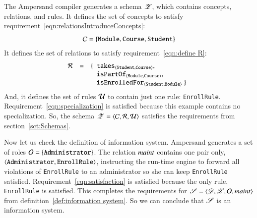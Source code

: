 \documentclass{elsarticle}
\begin{document}
   The Ampersand compiler generates a schema $\mathscr{Z}$, which contains concepts, relations, and rules.
   It defines the set of concepts to satisfy requirement~\ref{eqn:relationsIntroduceConcepts}:
   \[\mathcal{C}=\{ {\tt Module}, {\tt Course}, {\tt Student}\}\]
   It defines the set of relations to satisfy requirement~\ref{eqn:define R}:
   \[\begin{array}{rcl}
      \rels&=&\{\begin{array}[t]{l}
                  \declare{\tt takes}{\tt Student}{\tt Course},\\
                  \declare{\tt isPartOf}{\tt Module}{\tt Course},\\
                  \declare{\tt isEnrolledFor}{\tt Student}{\tt Module}\ \}
                \end{array}
     \end{array}
   \]
   And, it defines the set of rules $\mathcal{U}$ to contain just one rule: \verb-EnrollRule-.
   Requirement~\ref{eqn:specialization} is satisfied because this example contains no specialization.
   So, the schema $\mathscr{Z}=\langle{\mathcal{C}},{\mathcal{R}},{\mathcal{U}}\rangle$ satisfies the requirements from section~\ref{sct:Schemas}.

   Now let us check the definition of information system.
   Ampersand generates a set of roles $\mathcal{O}=\{{\tt Administrator}\}$.
   The relation $\text{\it maint\/}$ contains one pair only, $\langle{{\tt Administrator}},{{\tt EnrollRule}}\rangle$,
   instructing the run-time engine to forward all violations of {\tt EnrollRule} to an administrator so she can keep {\tt EnrollRule} satisfied.
   Requirement~\ref{eqn:satisfaction} is satisfied because the only rule, {\tt EnrollRule} is satisfied.
   This completes the requirements for $\mathscr{S}=\langle\mathscr{D},\mathscr{Z},\mathcal{O},\text{\it maint\/}\rangle$ from definition~\ref{def:information system}.
   So we can conclude that $\mathscr{S}$ is an  information system.
\end{document}
